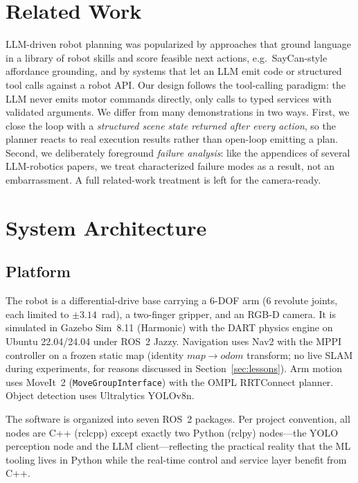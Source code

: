 \documentclass[conference]{IEEEtran}
\begin{document}
\section{Related Work}
LLM-driven robot planning was popularized by approaches that ground language in a
library of robot skills and score feasible next actions, e.g.\ SayCan-style
affordance grounding, and by systems that let an LLM emit code or structured tool
calls against a robot API. Our design follows the tool-calling paradigm: the LLM
never emits motor commands directly, only calls to typed services with validated
arguments. We differ from many demonstrations in two ways. First, we close the
loop with a \emph{structured scene state returned after every action}, so the
planner reacts to real execution results rather than open-loop emitting a plan.
Second, we deliberately foreground \emph{failure analysis}: like the appendices of
several LLM-robotics papers, we treat characterized failure modes as a result, not
an embarrassment. A full related-work treatment is left for the camera-ready.

\section{System Architecture}\label{sec:system}
\subsection{Platform}
The robot is a differential-drive base carrying a 6-DOF arm ($6$ revolute joints,
each limited to $\pm3.14$~rad), a two-finger gripper, and an RGB-D camera. It is
simulated in Gazebo Sim~8.11 (Harmonic) with the DART physics engine on Ubuntu
22.04/24.04 under ROS~2 Jazzy. Navigation uses Nav2 with the MPPI controller on a
frozen static map (identity $map\rightarrow odom$ transform; no live SLAM during
experiments, for reasons discussed in Section~\ref{sec:lessons}). Arm motion uses
MoveIt~2 (\texttt{MoveGroupInterface}) with the OMPL RRTConnect planner. Object
detection uses Ultralytics YOLOv8n.

The software is organized into seven ROS~2 packages. Per project convention, all
nodes are C++ (rclcpp) except exactly two Python (rclpy) nodes---the YOLO
perception node and the LLM client---reflecting the practical reality that the ML
tooling lives in Python while the real-time control and service layer benefit from
C++.
\end{document}
